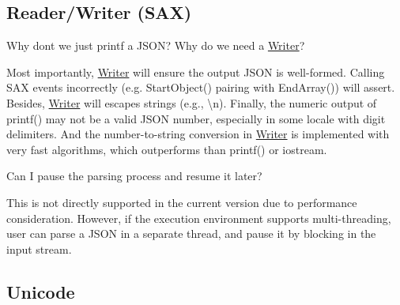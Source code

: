 \subsection*{Reader/\+Writer (S\+AX)}


\begin{DoxyEnumerate}
\item Why don\textquotesingle{}t we just {\ttfamily printf} a J\+S\+ON? Why do we need a {\ttfamily \hyperlink{class_writer}{Writer}}?

Most importantly, {\ttfamily \hyperlink{class_writer}{Writer}} will ensure the output J\+S\+ON is well-\/formed. Calling S\+AX events incorrectly (e.\+g. {\ttfamily Start\+Object()} pairing with {\ttfamily End\+Array()}) will assert. Besides, {\ttfamily \hyperlink{class_writer}{Writer}} will escapes strings (e.\+g., {\ttfamily \textbackslash{}n}). Finally, the numeric output of {\ttfamily printf()} may not be a valid J\+S\+ON number, especially in some locale with digit delimiters. And the number-\/to-\/string conversion in {\ttfamily \hyperlink{class_writer}{Writer}} is implemented with very fast algorithms, which outperforms than {\ttfamily printf()} or {\ttfamily iostream}.
\item Can I pause the parsing process and resume it later?

This is not directly supported in the current version due to performance consideration. However, if the execution environment supports multi-\/threading, user can parse a J\+S\+ON in a separate thread, and pause it by blocking in the input stream.
\end{DoxyEnumerate}

\subsection*{Unicode}


